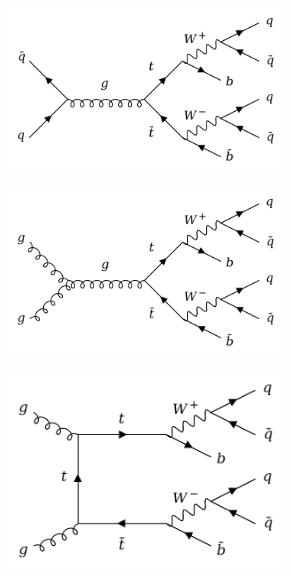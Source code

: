 \documentclass[main]{subfiles} %
\begin{document}
\begin{figure}[H]
     \centering
     \begin{subfigure}[h]{0.49\textwidth}
         \centering
         \includegraphics[width=0.8\textwidth]{../Figures/Datasets/pp_tt/qq_tt_qq.png}
          \caption{}
         \label{fig:feynman_tt_qqanihilation}
     \end{subfigure}
     \begin{subfigure}[h]{0.49\textwidth}
         \centering
         \includegraphics[width=0.8\textwidth]{../Figures/Datasets/pp_tt/gg_tt_qq_1.png}
          \caption{}
         \label{fig:feynman_tt_ggfusion1}
     \end{subfigure}
     \par\bigskip
     \begin{subfigure}[h]{0.49\textwidth}
         \centering
         \includegraphics[width=0.8\textwidth]{../Figures/Datasets/pp_tt/gg_tt_qq_2.png}

\end{subfigure}
\end{figure}
\end{document}
